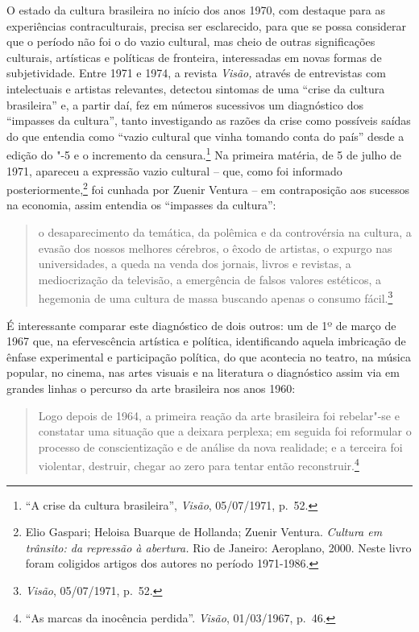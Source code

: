 \asterisc

O estado da cultura brasileira no início dos anos 1970, com destaque
para as experiências contraculturais, precisa ser esclarecido, para que
se possa considerar que o período não foi o do vazio cultural, mas cheio
de outras significações culturais, artísticas e políticas de fronteira,
interessadas em novas formas de subjetividade. Entre 1971 e 1974, a
revista \emph{Visão,} através de entrevistas com intelectuais e artistas
relevantes, detectou sintomas de uma ``crise da cultura brasileira'' e,
a partir daí, fez em números sucessivos um diagnóstico dos ``impasses da
cultura'', tanto investigando as razões da crise como possíveis saídas
do que entendia como ``vazio cultural que vinha tomando conta do
país'' desde a edição do "-5 e o incremento da censura.\footnote{``A
  crise da cultura brasileira'', \emph{Visão}, 05/07/1971, p.~52.} Na
primeira matéria, de 5 de julho de 1971, apareceu a expressão vazio
cultural -- que, como foi informado posteriormente,\footnote{Elio
  Gaspari; Heloisa Buarque de Hollanda; Zuenir Ventura. \emph{Cultura em
  trânsito: da repressão à abertura.} Rio de Janeiro: Aeroplano, 2000.
  Neste livro foram coligidos artigos dos autores no período 1971-1986.}
foi cunhada por Zuenir Ventura -- em contraposição aos sucessos na
economia, assim entendia os ``impasses da cultura'':

\begin{quote}
o desaparecimento da temática, da polêmica e da controvérsia na cultura,
a evasão dos nossos melhores cérebros, o êxodo de artistas, o expurgo
nas universidades, a queda na venda dos jornais, livros e revistas, a
mediocrização da televisão, a emergência de falsos valores estéticos, a
hegemonia de uma cultura de massa buscando apenas o consumo
fácil.\footnote{\emph{Visão}, 05/07/1971, p.~52.}
\end{quote}

É interessante comparar este diagnóstico de dois outros: um de 1º de
março de 1967 que, na efervescência artística e política, identificando
aquela imbricação de ênfase experimental e participação política, do que
acontecia no teatro, na música popular, no cinema, nas artes visuais e
na literatura o diagnóstico assim via em grandes linhas o percurso da
arte brasileira nos anos 1960:

\begin{quote}
Logo depois de 1964, a primeira reação da arte brasileira foi rebelar"-se
e constatar uma situação que a deixara perplexa; em seguida foi
reformular o processo de conscientização e de análise da nova realidade;
e a terceira foi violentar, destruir, chegar ao zero para tentar então
reconstruir.\footnote{``As marcas da inocência perdida''. \emph{Visão},
  01/03/1967, p.~46.}
\end{quote}

